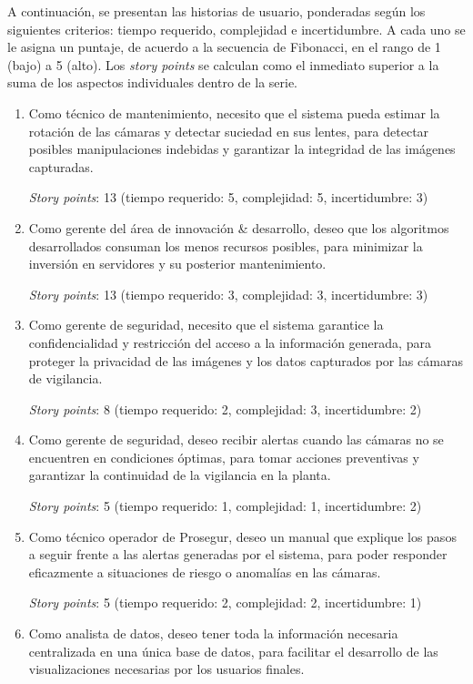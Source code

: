 \documentclass[
11pt, %
]{charter}
\begin{document}
A continuación, se presentan las historias de usuario, ponderadas según los siguientes criterios: tiempo requerido, complejidad e incertidumbre. A cada uno se le asigna un puntaje, de acuerdo a la secuencia de Fibonacci, en el rango de 1 (bajo) a 5 (alto). Los \textit{story points} se calculan como el inmediato superior a la suma de los aspectos individuales dentro de la serie.

\begin{enumerate}
	\item Como técnico de mantenimiento, necesito que el sistema pueda estimar la rotación de las cámaras y detectar suciedad en sus lentes, para detectar posibles manipulaciones indebidas y garantizar la integridad de las imágenes capturadas.

\textit{Story points}: 13 (tiempo requerido: 5, complejidad: 5, incertidumbre: 3)	

	\item Como gerente del área de innovación \& desarrollo, deseo que los algoritmos desarrollados consuman los menos recursos posibles, para minimizar la inversión en servidores y su posterior mantenimiento. 
	
\textit{Story points}: 13 (tiempo requerido: 3, complejidad: 3, incertidumbre: 3)	

	\item Como gerente de seguridad, necesito que el sistema garantice la confidencialidad y restricción del acceso a la información generada, para proteger la privacidad de las imágenes y los datos capturados por las cámaras de vigilancia.
	
\textit{Story points}: 8 (tiempo requerido: 2, complejidad: 3, incertidumbre: 2)	

	\item Como gerente de seguridad, deseo recibir alertas cuando las cámaras no se encuentren en condiciones óptimas, para tomar acciones preventivas y garantizar la continuidad de la vigilancia en la planta.
	
\textit{Story points}: 5 (tiempo requerido: 1, complejidad: 1, incertidumbre: 2)	
	
	\item Como técnico operador de Prosegur, deseo un manual que explique los pasos a seguir frente a las alertas generadas por el sistema, para poder responder eficazmente a situaciones de riesgo o anomalías en las cámaras.
	
\textit{Story points}: 5 (tiempo requerido: 2, complejidad: 2, incertidumbre: 1)			
	\item Como analista de datos, deseo tener toda la información necesaria centralizada en una única base de datos, para facilitar el desarrollo de las visualizaciones necesarias por los usuarios finales.
	

\end{enumerate}
\end{document}
